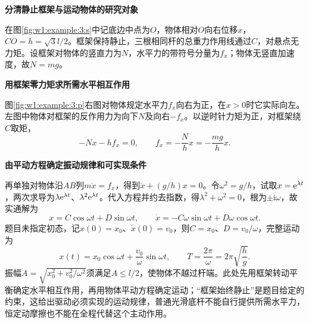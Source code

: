 \begin{solution}\textbf{分清静止框架与运动物体的研究对象}\par\nobreak
在图\ref{fig:w1:example:3:s}中记底边中点为$O$，物体相对$O$向右位移$x$，$CO=h=\sqrt3l/2$。框架保持静止，三根相同杆的总重力作用线通过$C$，对悬点无力矩。设框架对物体的竖直力为$N$，水平力的带符号分量为$f_x$；物体无竖直加速度，故$N=mg$。



\par\medskip{}\noindent\textbf{用框架零力矩求所需水平相互作用}\par\nobreak
图\ref{fig:w1:example:3:p}右图对物体规定水平力$f_x$向右为正，在$x>0$时它实际向左。左图中物体对框架的反作用力为向下$N$及向右$-f_x$。以逆时针力矩为正，对框架绕$C$取矩，
\[
-Nx-hf_x=0,\qquad f_x=-\frac{N}{h}x=-\frac{mg}{h}x.
\]


\par\medskip{}\noindent\textbf{由平动方程确定振动规律和可实现条件}\par\nobreak
再单独对物体沿$AB$列$m\ddot x=f_x$，得到$\ddot x+(g/h)x=0$。令$\omega^2=g/h$，试取$x=\mathrm e^{\lambda t}$，两次求导为$\lambda\mathrm e^{\lambda t}$、$\lambda^2\mathrm e^{\lambda t}$。代入方程并约去指数，得$\lambda^2+\omega^2=0$，根为$\pm\mathrm i\omega$，故实通解为
\[
x=C\cos\omega t+D\sin\omega t,\qquad
\dot x=-C\omega\sin\omega t+D\omega\cos\omega t.
\]
题目未指定初态，记$x(0)=x_0$、$\dot x(0)=v_0$，则$C=x_0$、$D=v_0/\omega$，完整运动为
\[
x(t)=x_0\cos\omega t+\frac{v_0}{\omega}\sin\omega t,
\qquad T=\frac{2\pi}{\omega}=2\pi\sqrt{\frac hg}.
\]
振幅$A=\sqrt{x_0^2+v_0^2/\omega^2}$须满足$A\le l/2$，使物体不越过杆端。此处先用框架转动平衡确定水平相互作用，再用物体平动方程确定运动；“框架始终静止”是题目给定的约束，这给出驱动必须实现的运动规律，普通光滑底杆不能自行提供所需水平力，恒定动摩擦也不能在全程代替这个主动作用。\end{solution}
